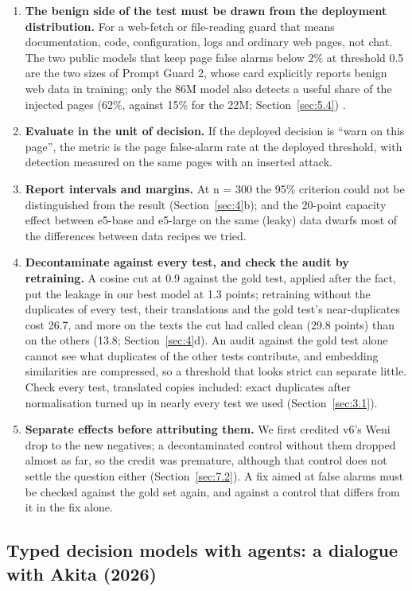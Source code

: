 \documentclass[11pt]{article}
\begin{document}
\begin{enumerate}
\item \textbf{The benign side of the test must be drawn from the deployment distribution.} For a web-fetch or file-reading guard that means documentation, code, configuration, logs and ordinary web pages, not chat. The two public models that keep page false alarms below 2\% at threshold 0.5 are the two sizes of Prompt Guard 2, whose card explicitly reports benign web data in training; only the 86M model also detects a useful share of the injected pages (62\%, against 15\% for the 22M; Section~\ref{sec:5.4})%
.
\item \textbf{Evaluate in the unit of decision.} If the deployed decision is ``warn on this page'', the metric is the page false-alarm rate at the deployed threshold, with detection measured on the same pages with an inserted attack.
\item \textbf{Report intervals and margins.} At n = 300 the 95\% criterion could not be distinguished from the result (Section~\ref{sec:4}b); and the 20-point capacity effect between e5-base and e5-large on the same (leaky) data %
dwarfs most of the differences between data recipes we tried.
\item \textbf{Decontaminate against every test, and check the audit by retraining.} A cosine cut at 0.9 against the gold test, applied after the fact, put the leakage in our best model at 1.3 points; retraining without the duplicates of every test, their translations and the gold test's near-duplicates cost 26.7, and more on the texts the cut had called clean (29.8 points) than on the others (13.8; Section~\ref{sec:4}d). An audit against the gold test alone cannot see what duplicates of the other tests contribute, and embedding similarities are compressed, so a threshold that looks strict can separate little. Check every test, translated copies included: exact duplicates after normalisation turned up in nearly every test we used (Section~\ref{sec:3.1}).
\item \textbf{Separate effects before attributing them.} We first credited v6's Weni drop to the new negatives; a decontaminated control without them dropped almost as far, so the credit was premature, although that control does not settle the question either (Section~\ref{sec:7.2}). A fix aimed at false alarms must be checked against the gold set again, and against a control that differs from it in the fix alone.
\end{enumerate}

\subsection{Typed decision models with agents: a dialogue with Akita (2026)}\label{sec:9.2}
\end{document}
